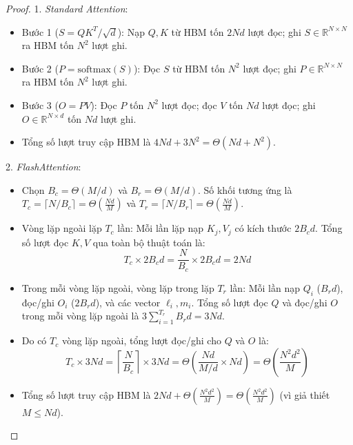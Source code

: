 \documentclass[10pt,a4paper]{article}
\begin{document}
\begin{proof}
1. \textit{Standard Attention}:
\begin{itemize}
    \item Bước 1 ($S = QK^T / \sqrt{d}$): Nạp $Q, K$ từ HBM tốn $2Nd$ lượt đọc; ghi $S \in \mathbb{R}^{N \times N}$ ra HBM tốn $N^2$ lượt ghi.
    \item Bước 2 ($P = \text{softmax}(S)$): Đọc $S$ từ HBM tốn $N^2$ lượt đọc; ghi $P \in \mathbb{R}^{N \times N}$ ra HBM tốn $N^2$ lượt ghi.
    \item Bước 3 ($O = PV$): Đọc $P$ tốn $N^2$ lượt đọc; đọc $V$ tốn $Nd$ lượt đọc; ghi $O \in \mathbb{R}^{N \times d}$ tốn $Nd$ lượt ghi.
    \item Tổng số lượt truy cập HBM là $4Nd + 3N^2 = \Theta(Nd + N^2)$.
\end{itemize}

2. \textit{FlashAttention}:
\begin{itemize}
    \item Chọn $B_c = \Theta(M/d)$ và $B_r = \Theta(M/d)$. Số khối tương ứng là $T_c = \lceil N / B_c \rceil = \Theta(\frac{Nd}{M})$ và $T_r = \lceil N / B_r \rceil = \Theta(\frac{Nd}{M})$.
    \item Vòng lặp ngoài lặp $T_c$ lần: Mỗi lần lặp nạp $K_j, V_j$ có kích thước $2 B_c d$. Tổng số lượt đọc $K, V$ qua toàn bộ thuật toán là:
    \begin{equation}
    T_c \times 2 B_c d = \frac{N}{B_c} \times 2 B_c d = 2Nd
    \end{equation}
    \item Trong mỗi vòng lặp ngoài, vòng lặp trong lặp $T_r$ lần: Mỗi lần nạp $Q_i$ ($B_r d$), đọc/ghi $O_i$ ($2 B_r d$), và các vector $\ell_i, m_i$. Tổng số lượt đọc $Q$ và đọc/ghi $O$ trong mỗi vòng lặp ngoài là $3 \sum_{i=1}^{T_r} B_r d = 3Nd$.
    \item Do có $T_c$ vòng lặp ngoài, tổng lượt đọc/ghi cho $Q$ và $O$ là:
    \begin{equation}
    T_c \times 3Nd = \left\lceil \frac{N}{B_c} \right\rceil \times 3Nd = \Theta\left(\frac{Nd}{M/d} \times Nd\right) = \Theta\left(\frac{N^2 d^2}{M}\right)
    \end{equation}
    \item Tổng số lượt truy cập HBM là $2Nd + \Theta\left(\frac{N^2 d^2}{M}\right) = \Theta\left(\frac{N^2 d^2}{M}\right)$ (vì giả thiết $M \le Nd$).
\end{itemize}
\end{proof}
\end{document}
